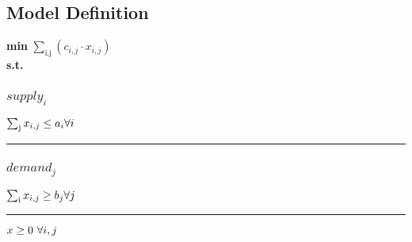 \documentclass[11pt]{article}
\begin{document}
\subsection*{Model Definition}
\textbf{min} $\sum_\text{i,j} (c_{i,j} \cdot x_{i,j})$\\
\textbf{s.t.}
\subsubsection*{$supply_{i}$}
$
\sum_\text{j} x_{i,j} \leq a_{i}\hfill \forall i
$
\vspace{5pt}
\hrule
\subsubsection*{$demand_{j}$}
$
\sum_\text{i} x_{i,j} \geq b_{j}\hfill \forall j
$
\vspace{5pt}
\hrule
\bigskip
$x\geq 0 ~ \forall i,j\\$
\end{document}

